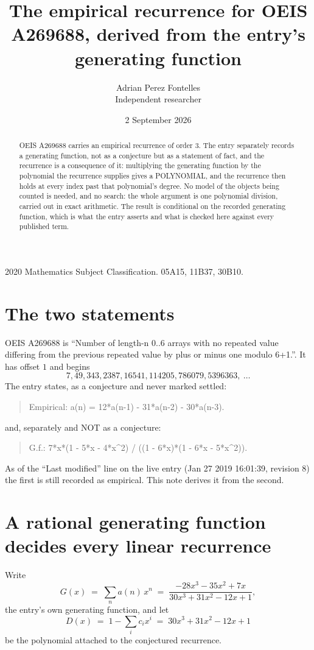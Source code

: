 \documentclass[11pt,a4paper]{article}
\title{The empirical recurrence for OEIS A269688, derived from the entry's generating function}
\author{Adrian Perez Fontelles\\ \small Independent researcher}
\date{2 September 2026}
\theoremstyle{plain}
\theoremstyle{definition}
\begin{document}
\maketitle

\begin{abstract}
OEIS A269688 carries an empirical recurrence of order $3$. The entry separately records a
generating function, not as a conjecture but as a statement of fact, and the recurrence is a
consequence of it: multiplying the generating function by the polynomial the recurrence
supplies gives a POLYNOMIAL, and the recurrence then holds at every index past that
polynomial's degree. No model of the objects being counted is needed, and no search: the
whole argument is one polynomial division, carried out in exact arithmetic. The result is
conditional on the recorded generating function, which is what the entry asserts and what is
checked here against every published term.
\end{abstract}

\noindent\small 2020 Mathematics Subject Classification. 05A15, 11B37, 30B10.\normalsize

\section{The two statements}

OEIS A269688 is ``Number of length-n 0..6 arrays with no repeated value differing from the previous repeated value by plus or minus one modulo 6+1.''. It has offset $1$ and begins
\[
7, 49, 343, 2387, 16541, 114205, 786079, 5396363,\ \dots
\]
The entry states, as a conjecture and never marked settled:
\begin{quote}
Empirical: a(n) = 12*a(n-1) - 31*a(n-2) - 30*a(n-3).
\end{quote}
and, separately and NOT as a conjecture:
\begin{quote}
G.f.: 7*x*(1 - 5*x - 4*x\^{}2) / ((1 - 6*x)*(1 - 6*x - 5*x\^{}2)).
\end{quote}
As of the ``Last modified'' line on the live entry (Jan 27 2019 16:01:39, revision 8) the first is still
recorded as empirical. This note derives it from the second.

\section{A rational generating function decides every linear recurrence}

Write
\[
G(x)\;=\;\sum_{n}a(n)\,x^{n}\;=\;\frac{- 28 x^{3} - 35 x^{2} + 7 x}{30 x^{3} + 31 x^{2} - 12 x + 1},
\]
the entry's own generating function, and let
\[
D(x)\;=\;1-\sum_i c_i x^{i}\;=\;30 x^{3} + 31 x^{2} - 12 x + 1
\]
be the polynomial attached to the conjectured recurrence.
\end{document}

